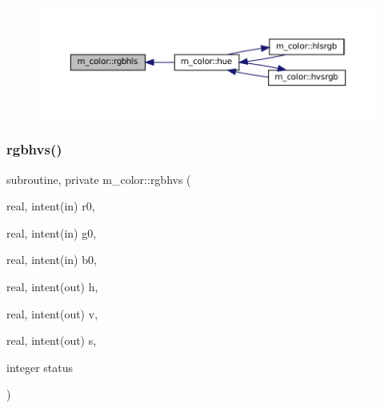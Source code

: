 \nopagebreak
\begin{figure}[H]
\begin{center}
\leavevmode
\includegraphics[width=350pt]{namespacem__color_a1dd027cbe65112af243d26195b1fc49a_icgraph}
\end{center}
\end{figure}
\mbox{\label{namespacem__color_a76f00e1d418c4904a963094bc730a0e6}} 
\subsubsection{\texorpdfstring{rgbhvs()}{rgbhvs()}}
{\footnotesize\ttfamily subroutine, private m\+\_\+color\+::rgbhvs (\begin{DoxyParamCaption}\item[{real, intent(in)}]{r0,  }\item[{real, intent(in)}]{g0,  }\item[{real, intent(in)}]{b0,  }\item[{real, intent(out)}]{h,  }\item[{real, intent(out)}]{v,  }\item[{real, intent(out)}]{s,  }\item[{integer}]{status }\end{DoxyParamCaption})\hspace{0.3cm}{\ttfamily [private]}}


